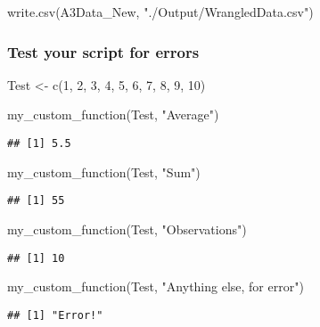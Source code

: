 \documentclass[
]{article}
\newenvironment{Shaded}{\begin{snugshade}}{\end{snugshade}}
\newcommand{\DecValTok}[1]{\textcolor[rgb]{0.00,0.00,0.81}{#1}}
\newcommand{\FunctionTok}[1]{\textcolor[rgb]{0.00,0.00,0.00}{#1}}
\newcommand{\NormalTok}[1]{#1}
\newcommand{\OtherTok}[1]{\textcolor[rgb]{0.56,0.35,0.01}{#1}}
\newcommand{\StringTok}[1]{\textcolor[rgb]{0.31,0.60,0.02}{#1}}
\begin{document}
\begin{Shaded}
\begin{Highlighting}[]
\FunctionTok{write.csv}\NormalTok{(A3Data\_New, }\StringTok{"./Output/WrangledData.csv"}\NormalTok{) }
\end{Highlighting}
\end{Shaded}

\hypertarget{test-your-script-for-errors}{%
\subsubsection{Test your script for
errors}\label{test-your-script-for-errors}}

\begin{Shaded}
\begin{Highlighting}[]
\NormalTok{Test }\OtherTok{\textless{}{-}} \FunctionTok{c}\NormalTok{(}\DecValTok{1}\NormalTok{, }\DecValTok{2}\NormalTok{, }\DecValTok{3}\NormalTok{, }\DecValTok{4}\NormalTok{, }\DecValTok{5}\NormalTok{, }\DecValTok{6}\NormalTok{, }\DecValTok{7}\NormalTok{, }\DecValTok{8}\NormalTok{, }\DecValTok{9}\NormalTok{, }\DecValTok{10}\NormalTok{)}

\FunctionTok{my\_custom\_function}\NormalTok{(Test, }\StringTok{"Average"}\NormalTok{)}
\end{Highlighting}
\end{Shaded}

\begin{verbatim}
## [1] 5.5
\end{verbatim}

\begin{Shaded}
\begin{Highlighting}[]
\FunctionTok{my\_custom\_function}\NormalTok{(Test, }\StringTok{"Sum"}\NormalTok{)}
\end{Highlighting}
\end{Shaded}

\begin{verbatim}
## [1] 55
\end{verbatim}

\begin{Shaded}
\begin{Highlighting}[]
\FunctionTok{my\_custom\_function}\NormalTok{(Test, }\StringTok{"Observations"}\NormalTok{)}
\end{Highlighting}
\end{Shaded}

\begin{verbatim}
## [1] 10
\end{verbatim}

\begin{Shaded}
\begin{Highlighting}[]
\FunctionTok{my\_custom\_function}\NormalTok{(Test, }\StringTok{"Anything else, for error"}\NormalTok{)}
\end{Highlighting}
\end{Shaded}

\begin{verbatim}
## [1] "Error!"
\end{verbatim}
\end{document}
